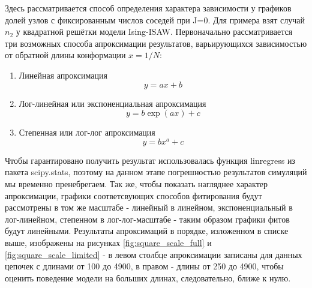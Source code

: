 Здесь рассматривается способ определения характера зависимости у графиков долей узлов с фиксированным числов соседей при J=0. Для примера взят случай $n_{2}$ у квадратной решётки модели Ising-ISAW. Первоначально рассматривается три возможных способа апроксимации результатов, варьирующихся зависимостью от обратной длины конформации $x = 1/N$:

\begin{enumerate}
    \item Линейная апроксимация 
    \begin{equation}
    \label{eq:linreg}
        y = a x + b
    \end{equation}
    \item Лог-линейная или экспоненциальная апроксимация 
    \begin{equation}
        y = b \exp{(a x)} + c 
    \end{equation}
    \item Степенная или лог-лог апроксимация
    \begin{equation}
        y = b x^{a} + c
    \end{equation}
\end{enumerate}

Чтобы гарантировано получить результат использовалась функция linregress из пакета scipy.stats, поэтому на данном этапе погрешностью результатов симуляций мы временно пренебрегаем. Так же, чтобы показать нагляднее характер апроксимации, графики соответсвующих способов фитирования будут рассмотрены в том же масштабе - линейный в линейном, экспоненциальный в лог-линейном, степенном в лог-лог-масштабе - таким образом графики фитов будут линейными. Результаты апроксимаций в порядке, изложенном в списке выше, изображены на рисунках \ref{fig:square_scale_full} и \ref{fig:square_scale_limited} - в левом столбце апроксимации записаны для данных цепочек с длинами от 100 до 4900, в правом - длины от 250 до 4900, чтобы оценить поведение модели на больших длинах, следовательно, ближе к нулю.

